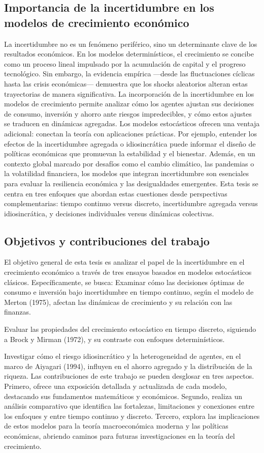 \documentclass[a4paper,12pt]{article}
\begin{document}
	\subsection{Importancia de la incertidumbre en los modelos de crecimiento económico}
	La incertidumbre no es un fenómeno periférico, sino un determinante clave de los resultados económicos. En los modelos determinísticos, el crecimiento se concibe como un proceso lineal impulsado por la acumulación de capital y el progreso tecnológico. Sin embargo, la evidencia empírica —desde las fluctuaciones cíclicas hasta las crisis económicas— demuestra que los shocks aleatorios alteran estas trayectorias de manera significativa. La incorporación de la incertidumbre en los modelos de crecimiento permite analizar cómo los agentes ajustan sus decisiones de consumo, inversión y ahorro ante riesgos impredecibles, y cómo estos ajustes se traducen en dinámicas agregadas.
	Los modelos estocásticos ofrecen una ventaja adicional: conectan la teoría con aplicaciones prácticas. Por ejemplo, entender los efectos de la incertidumbre agregada o idiosincrática puede informar el diseño de políticas económicas que promuevan la estabilidad y el bienestar. Además, en un contexto global marcado por desafíos como el cambio climático, las pandemias o la volatilidad financiera, los modelos que integran incertidumbre son esenciales para evaluar la resiliencia económica y las desigualdades emergentes. Esta tesis se centra en tres enfoques que abordan estas cuestiones desde perspectivas complementarias: tiempo continuo versus discreto, incertidumbre agregada versus idiosincrática, y decisiones individuales versus dinámicas colectivas.
	
	\subsection{Objetivos y contribuciones del trabajo}
	El objetivo general de esta tesis es analizar el papel de la incertidumbre en el crecimiento económico a través de tres ensayos basados en modelos estocásticos clásicos. Específicamente, se busca:
	Examinar cómo las decisiones óptimas de consumo e inversión bajo incertidumbre en tiempo continuo, según el modelo de Merton (1975), afectan las dinámicas de crecimiento y su relación con las finanzas.
	
	Evaluar las propiedades del crecimiento estocástico en tiempo discreto, siguiendo a Brock y Mirman (1972), y su contraste con enfoques determinísticos.
	
	Investigar cómo el riesgo idiosincrático y la heterogeneidad de agentes, en el marco de Aiyagari (1994), influyen en el ahorro agregado y la distribución de la riqueza.
	Las contribuciones de este trabajo se pueden desglosar en tres aspectos. Primero, ofrece una exposición detallada y actualizada de cada modelo, destacando sus fundamentos matemáticos y económicos. Segundo, realiza un análisis comparativo que identifica las fortalezas, limitaciones y conexiones entre los enfoques y entre tiempo continuo y discreto. Tercero, explora las implicaciones de estos modelos para la teoría macroeconómica moderna y las políticas económicas, abriendo caminos para futuras investigaciones en la teoría del crecimiento.
	
\end{document}
